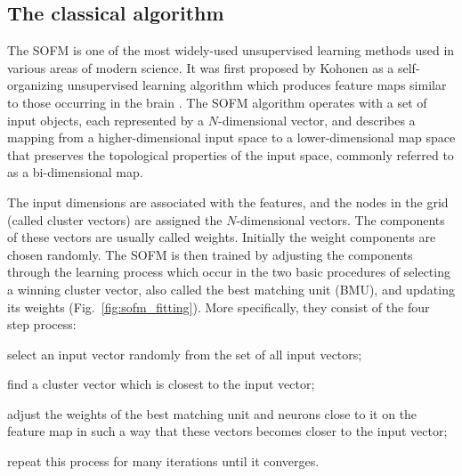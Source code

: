 \documentclass[pra,showkeys,twocolumn,showpacs,aps,10pt]{revtex4-1}
\begin{document}
\subsection{The classical algorithm}


The SOFM is one of the most widely-used unsupervised learning methods used in various areas of modern science.
It was first proposed by Kohonen as a self-organizing unsupervised learning algorithm which produces feature maps similar to those occurring in the brain \cite{solan2001}.
The SOFM algorithm operates with a set of input objects, each represented by a $N$-dimensional vector,
and describes a mapping from a higher-dimensional input space to a lower-dimensional map space that preserves the topological properties of the input space, commonly referred to as a bi-dimensional map.

The input dimensions are associated with the features,
and the nodes in the grid (called cluster vectors) are assigned the $N$-dimensional vectors.
The components of these vectors are usually called weights.
Initially the weight components are chosen randomly.
The SOFM is then trained by adjusting the components through the learning process which occur in the two basic procedures of
selecting a winning cluster vector, also called the best matching unit (BMU), and updating its weights (Fig.~\ref{fig:sofm_fitting}).
More specifically, they consist of the four step process:
\begin{enumerate*}
\item select an input vector randomly from the set of all input vectors;
\item find a cluster vector which is closest to the input vector;
\item adjust the weights of the best matching unit and neurons close to it on the feature map in such a way
  that these vectors  becomes closer to the input vector;
\item repeat this process for many iterations until it converges.
\end{enumerate*}
\end{document}
